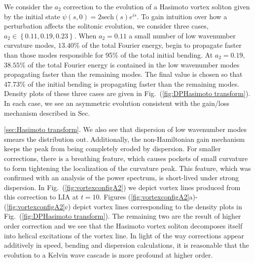 \documentclass[aps,graphicx,reprint,onecolumn,12pt,tightenlines,longbibliography]{revtex4-1}
\newcommand{\sas}[2]{{#2}}
\begin{document}
We consider the $a_{2}$ correction to the evolution of a Hasimoto vortex soliton given by the initial state $\psi(s,0) = 2 \mbox{sech}(s) e^{is}$. To gain intuition over how a perturbation affects the solitonic evolution, we consider three cases\sas{}{,} $a_{2} \in \left\{0.11,0.19,0.23\right\}$. When $a_{2}=0.11$ a small number of low wavenumber curvature modes, $13.40$\% of the total Fourier energy, begin to propagate faster than those modes responsible for 95\% of the total initial bending. At $a_{2}=0.19$, $38.55$\% of the total Fourier energy is contained in the low wavenumber modes propagating faster than the remaining modes. The final value is chosen so that 47.73\% of the initial bending is propagating faster than the remaining modes. Density plots of these three cases are given in Fig.~(\ref{fig:DPHasimoto transform}). In each \sas{}{case}, we see an asymmetric evolution consistent with the gain/loss mechanism described in Sec.~{\ref{sec:Hasimoto transform}. We also\sas{,}{} see that \sas{as}{} dispersion of low wavenumber modes smears the distribution out\sas{}{.} \sas{and the peak is not completely eroded, which is due to the support it receives from the non-Hamiltonian gain mechanism.}{Additionally, the non-Hamiltonian gain mechanism keeps the peak from being completely eroded by dispersion.} \sas{Additionally, we see that f}{F}or smaller corrections, there is a breathing feature, which causes pockets of small curvature to form tightening the localization of the curvature peak. This feature, which was confirmed with an analysis of the power spectrum, is short-lived  under strong dispersion. In Fig.~(\ref{fig:vortexconfigA2}) we depict vortex lines produced from this correction to LIA at $t=10$. Figures (\ref{fig:vortexconfigA2}a)-(\ref{fig:vortexconfigA2}c) depict vortex lines corresponding to  the density plots in Fig.~(\ref{fig:DPHasimoto transform}). The remaining two are the result of higher order correction and we see that the Hasimoto vortex soliton decomposes itself into helical excitations of the vortex line. In light of the way corrections appear additively in speed, bending and dispersion calculations, it is reasonable that the evolution to a Kelvin wave cascade is more profound at higher order.  
%
\begin{figure}

\end{figure}}
\end{document}
